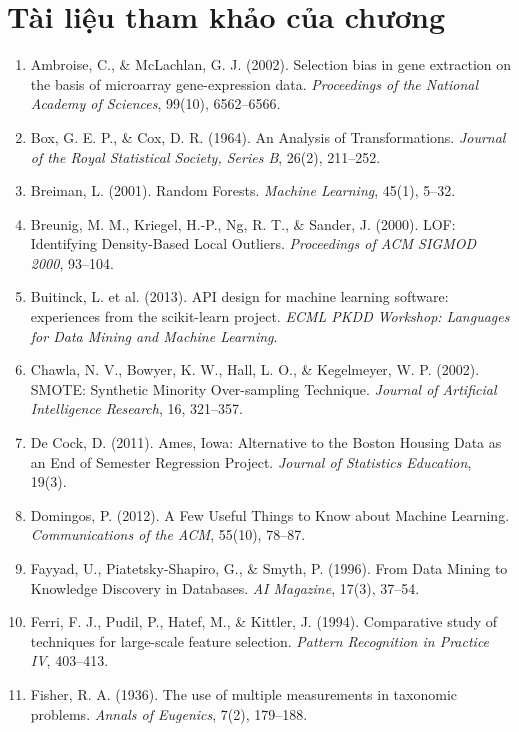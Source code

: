 \section*{Tài liệu tham khảo của chương}
\begin{enumerate}
    \item Ambroise, C., \& McLachlan, G. J. (2002). Selection bias in gene extraction on the basis of microarray gene-expression data. \textit{Proceedings of the National Academy of Sciences}, 99(10), 6562--6566.
    \item Box, G. E. P., \& Cox, D. R. (1964). An Analysis of Transformations. \textit{Journal of the Royal Statistical Society, Series B}, 26(2), 211--252.
    \item Breiman, L. (2001). Random Forests. \textit{Machine Learning}, 45(1), 5--32.
    \item Breunig, M. M., Kriegel, H.-P., Ng, R. T., \& Sander, J. (2000). LOF: Identifying Density-Based Local Outliers. \textit{Proceedings of ACM SIGMOD 2000}, 93--104.
    \item Buitinck, L. et al. (2013). API design for machine learning software: experiences from the scikit-learn project. \textit{ECML PKDD Workshop: Languages for Data Mining and Machine Learning}.
    \item Chawla, N. V., Bowyer, K. W., Hall, L. O., \& Kegelmeyer, W. P. (2002). SMOTE: Synthetic Minority Over-sampling Technique. \textit{Journal of Artificial Intelligence Research}, 16, 321--357.
    \item De Cock, D. (2011). Ames, Iowa: Alternative to the Boston Housing Data as an End of Semester Regression Project. \textit{Journal of Statistics Education}, 19(3).
    \item Domingos, P. (2012). A Few Useful Things to Know about Machine Learning. \textit{Communications of the ACM}, 55(10), 78--87.
    \item Fayyad, U., Piatetsky-Shapiro, G., \& Smyth, P. (1996). From Data Mining to Knowledge Discovery in Databases. \textit{AI Magazine}, 17(3), 37--54.
    \item Ferri, F. J., Pudil, P., Hatef, M., \& Kittler, J. (1994). Comparative study of techniques for large-scale feature selection. \textit{Pattern Recognition in Practice IV}, 403--413.
    \item Fisher, R. A. (1936). The use of multiple measurements in taxonomic problems. \textit{Annals of Eugenics}, 7(2), 179--188.

\end{enumerate}
